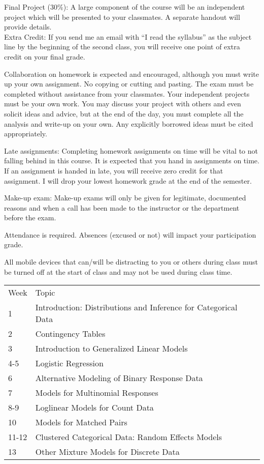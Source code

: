 \documentclass[10pt]{article}
\begin{document}
\noindent Final Project (30\%): A large component of the course will be an independent project which will be presented to your classmates. A separate handout will provide details. \\


\noindent Extra Credit: If you send me an email with ``I read the syllabus'' as the subject line by the beginning of the second class, you will receive one point of extra credit on your final grade. 

\bigskip
{}

Collaboration on homework is expected and encouraged, although you must write up your own assignment. No copying or cutting and pasting. The exam must be completed without assistance from your classmates. Your independent projects must be your own work. You may discuss your project with others and even solicit ideas and advice, but at the end of the day, you must complete all the analysis and write-up on your own. Any explicitly borrowed ideas must be cited appropriately.

Late assignments: Completing homework assignments on time will be vital to not falling behind in this course. It is expected that you hand in assignments on time. If an assignment is handed in late, you will receive zero credit for that assignment. I will drop your lowest homework grade at the end of the semester.

Make-up exam: Make-up exams will only be given for legitimate, documented reasons and when a call has been made to the instructor or the department before the exam.

Attendance is required. Absences (excused or not) will impact your participation grade.

All mobile devices that can/will be distracting to you or others during class must be turned off at the start of class and may not be used during class time.
  
  {
\bigskip
{}
  \begin{table}[htp]
\begin{tabular}{ll}
Week & Topic \\
1 & Introduction: Distributions and Inference for Categorical Data \\
2 & Contingency Tables \\
3 & Introduction to Generalized Linear Models \\
4-5 &	Logistic Regression \\
6 & Alternative Modeling of Binary Response Data \\
7 & Models for Multinomial Responses \\
8-9 & Loglinear Models for Count Data \\
10 & Models for Matched Pairs \\
11-12 & Clustered Categorical Data: Random Effects Models \\
13 & Other Mixture Models for Discrete Data
\end{tabular}
\end{table}%
}
\end{document}

